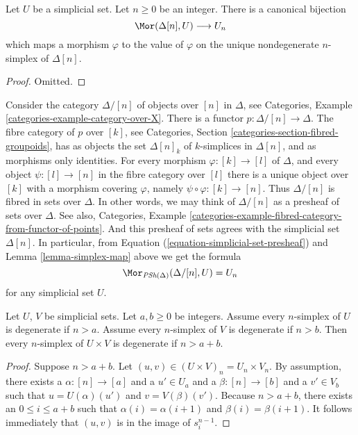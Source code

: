\begin{lemma}
\label{lemma-simplex-map}
Let $U$ be a simplicial set. Let $n \geq 0$ be an integer.
There is a canonical bijection
$$
\Mor(\Delta[n], U)
\longrightarrow
U_n
$$
which maps a morphism $\varphi$ to the value of $\varphi$
on the unique nondegenerate $n$-simplex of $\Delta[n]$.
\end{lemma}

\begin{proof}
Omitted.
\end{proof}

\begin{example}
\label{example-simplex-category}
Consider the category $\Delta/[n]$ of objects over $[n]$
in $\Delta$, see
Categories, Example \ref{categories-example-category-over-X}.
There is a functor $p : \Delta/[n] \to \Delta$.
The fibre category of $p$ over $[k]$, see
Categories, Section \ref{categories-section-fibred-groupoids},
has as objects the
set $\Delta[n]_k$ of $k$-simplices in $\Delta[n]$, and as
morphisms only identities. For every morphism
$\varphi : [k] \to [l]$ of $\Delta$, and every object $\psi : [l] \to [n]$
in the fibre category over $[l]$ there is a unique
object over $[k]$ with a morphism covering $\varphi$, namely
$\psi \circ \varphi : [k] \to [n]$. Thus $\Delta/[n]$
is fibred in sets over $\Delta$. In other words, we may
think of $\Delta/[n]$ as a presheaf of sets over $\Delta$.
See also, Categories,
Example \ref{categories-example-fibred-category-from-functor-of-points}.
And this presheaf of sets agrees with the simplicial set
$\Delta[n]$. In particular, from Equation
(\ref{equation-simplicial-set-presheaf}) and
Lemma \ref{lemma-simplex-map} above
we get the formula
$$
\Mor_{\textit{PSh}(\Delta)}(\Delta/[n], U) = U_n
$$
for any simplicial set $U$.
\end{example}

\begin{lemma}
\label{lemma-product-degenerate}
Let $U$, $V$ be simplicial sets.
Let $a, b \geq 0$ be integers.
Assume every $n$-simplex of $U$ is degenerate if $n > a$.
Assume every $n$-simplex of $V$ is degenerate if $n > b$.
Then every $n$-simplex of $U \times V$ is degenerate
if $n > a + b$.
\end{lemma}

\begin{proof}
Suppose $n > a + b$. Let $(u, v) \in (U \times V)_n = U_n \times V_n$.
By assumption, there exists a $\alpha : [n] \to [a]$ and a
$u' \in U_a$ and a $\beta : [n] \to [b]$ and a $v' \in V_b$
such that $u = U(\alpha)(u')$ and $v = V(\beta)(v')$. Because
$n > a + b$, there exists an $0 \leq i \leq a + b$ such that
$\alpha(i) = \alpha(i + 1)$ and
$\beta(i) = \beta(i + 1)$. It follows immediately
that $(u, v)$ is in the image of $s^{n - 1}_i$.
\end{proof}



